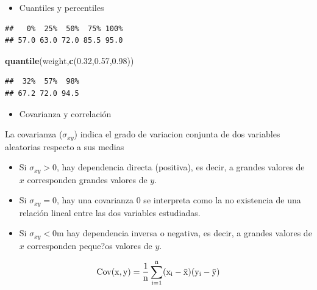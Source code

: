 \documentclass[]{book}
\newenvironment{Shaded}{\begin{snugshade}}{\end{snugshade}}
\newcommand{\KeywordTok}[1]{\textcolor[rgb]{0.13,0.29,0.53}{\textbf{#1}}}
\newcommand{\FloatTok}[1]{\textcolor[rgb]{0.00,0.00,0.81}{#1}}
\newcommand{\CommentTok}[1]{\textcolor[rgb]{0.56,0.35,0.01}{\textit{#1}}}
\newcommand{\NormalTok}[1]{#1}
\providecommand{\tightlist}{%
  \setlength{\itemsep}{0pt}\setlength{\parskip}{0pt}}
\begin{document}
\begin{itemize}
\tightlist
\item
  Cuantiles y percentiles
\end{itemize}

\begin{Shaded}
\end{Shaded}

\begin{verbatim}
##   0%  25%  50%  75% 100% 
## 57.0 63.0 72.0 85.5 95.0
\end{verbatim}

\begin{Shaded}
\begin{Highlighting}[]
\KeywordTok{quantile}\NormalTok{(weight,}\KeywordTok{c}\NormalTok{(}\FloatTok{0.32}\NormalTok{,}\FloatTok{0.57}\NormalTok{,}\FloatTok{0.98}\NormalTok{))}
\end{Highlighting}
\end{Shaded}

\begin{verbatim}
##  32%  57%  98% 
## 67.2 72.0 94.5
\end{verbatim}

\begin{itemize}
\tightlist
\item
  Covarianza y correlación
\end{itemize}

La covarianza (\(\sigma_{xy}\)) indica el grado de variacion conjunta de
dos variables aleatorias respecto a sus medias

\begin{itemize}
\tightlist
\item
  Si \(\sigma_{xy}> 0\), hay dependencia directa (positiva), es decir, a
  grandes valores de \(x\) corresponden grandes valores de \(y\).
\item
  Si \(\sigma_{xy}= 0\), hay una covarianza 0 se interpreta como la no
  existencia de una relación lineal entre las dos variables estudiadas.
\item
  Si \(\sigma_{xy}< 0\)m hay dependencia inversa o negativa, es decir, a
  grandes valores de \(x\) corresponden peque?os valores de \(y\).
\end{itemize}

\[
\rm{Cov}(x,y) = \frac{1}{n}\sum_{i=1}^{n}(x_i - \bar{x})(y_i - \bar{y})
\]
\end{document}
